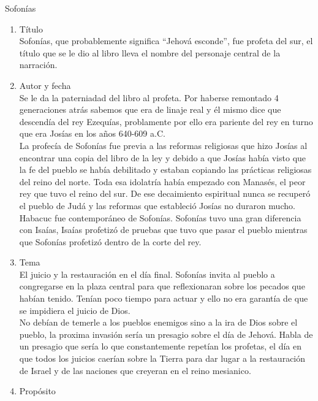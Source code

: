 %
%
\begin{section}{Sofonías}
	\begin{enumerate}
		\item Título\\
			Sofonías, que probablemente significa ``Jehová esconde'', fue profeta del sur, el título que se le dio al libro lleva el nombre del personaje central de la narración.
		\item Autor y fecha\\
			Se le da la paterniadad del libro al profeta. Por haberse remontado 4 generaciones atrás sabemos que era de linaje real y él mismo dice que descendía del rey Ezequías, problamente por ello era pariente del rey en turno que era Josías en los años 640-609 a.C.\\
			La profecía de Sofonías fue previa a las reformas religiosas que hizo Josías al encontrar una copia del libro de la ley y debido a que Josías había visto que la fe del pueblo se había debilitado y estaban copiando las prácticas religiosas del reino del norte. Toda esa idolatría había empezado con Manasés, el peor rey que tuvo el reino del sur. De ese decaimiento espiritual nunca se recuperó el pueblo de Judá y las reformas que estableció Josías no duraron mucho.\\
			Habacuc fue contemporáneo de Sofonías. Sofonías tuvo una gran diferencia con Isaías, Isaías profetizó de pruebas que tuvo que pasar el pueblo mientras que Sofonías profetizó dentro de la corte del rey.
		\item Tema\\
			El juicio y la restauración en el día final. Sofonías invita al pueblo a congregarse en la plaza central para que reflexionaran sobre los pecados que habían tenido. Tenían poco tiempo para actuar y ello no era garantía de que se impidiera el juicio de Dios.\\
			No debían de temerle a los pueblos enemigos sino a la ira de Dios sobre el pueblo, la proxima invasión sería un presagio sobre el día de Jehová. Habla de un presagio que sería lo que constantemente repetían los profetas, el día en que todos los juicios caerían sobre la Tierra para dar lugar a la restauración de Israel y de las naciones que creyeran en el reino mesianico.
		\item Propósito\\

\end{enumerate}
\end{section}

